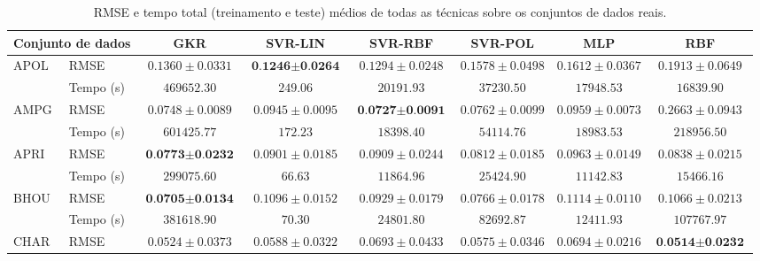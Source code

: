\begin{landscape}
    \begin{table}[h]
        \centering
        \caption{RMSE e tempo total (treinamento e teste) médios de todas as técnicas sobre os conjuntos de dados reais.}
        \label{tab:results-rmse}
        \begin{tabular}{l|l|c@{\hskip 5pt}c@{\hskip 5pt}c@{\hskip 5pt}c@{\hskip 5pt}c@{\hskip 5pt}c}
            \toprule
            \multicolumn{2}{l}{\textbf{Conjunto de dados}} & \textbf{GKR} & \textbf{SVR-LIN} & \textbf{SVR-RBF} & \textbf{SVR-POL} & \textbf{MLP} & \textbf{RBF} \\
            \midrule
            \multirow{2}{*}{APOL}   & RMSE & $0.1360 \pm 0.0331$ & $\textbf{0.1246} \pm \textbf{0.0264}$ & $0.1294 \pm 0.0248$ & $0.1578 \pm 0.0498$ & $0.1612 \pm 0.0367$ & $0.1913 \pm 0.0649$ \\
                                    & Tempo (s) & $469652.30$ & $249.06$ & $20191.93$ & $37230.50$ & $17948.53$ & $16839.90$ \\
            \midrule
            \multirow{2}{*}{AMPG}   & RMSE & $0.0748 \pm 0.0089$ & $0.0945 \pm 0.0095$ & $\textbf{0.0727} \pm \textbf{0.0091}$ & $0.0762 \pm 0.0099$ & $0.0959 \pm 0.0073$ & $0.2663 \pm 0.0943$ \\
                                    & Tempo (s) & $601425.77$ & $172.23$ & $18398.40$ & $54114.76$ & $18983.53$ & $218956.50$ \\
            \midrule
            \multirow{2}{*}{APRI}   & RMSE & $\textbf{0.0773} \pm \textbf{0.0232}$ & $0.0901 \pm 0.0185$ & $0.0909 \pm 0.0244$ & $0.0812 \pm 0.0185$ & $0.0963 \pm 0.0149$ & $0.0838 \pm 0.0215$ \\
                                    & Tempo (s) & $299075.60$ & $66.63$ & $11864.96$ & $25424.90$ & $11142.83$ & $15466.16$ \\
            \midrule
            \multirow{2}{*}{BHOU}   & RMSE & $\textbf{0.0705} \pm \textbf{0.0134}$ & $0.1096 \pm 0.0152$ & $0.0929 \pm 0.0179$ & $0.0766 \pm 0.0178$ & $0.1114 \pm 0.0110$ & $0.1066 \pm 0.0213$ \\
                                    & Tempo (s) & $381618.90$ & $70.30$ & $24801.80$ & $82692.87$ & $12411.93$ & $107767.97$ \\
            \midrule
            \multirow{2}{*}{CHAR}   & RMSE & $0.0524 \pm 0.0373$ & $0.0588 \pm 0.0322$ & $0.0693 \pm 0.0433$ & $0.0575 \pm 0.0346$ & $0.0694 \pm 0.0216$ & $\textbf{0.0514} \pm \textbf{0.0232}$ \\

\end{tabular}
\end{table}
\end{landscape}
